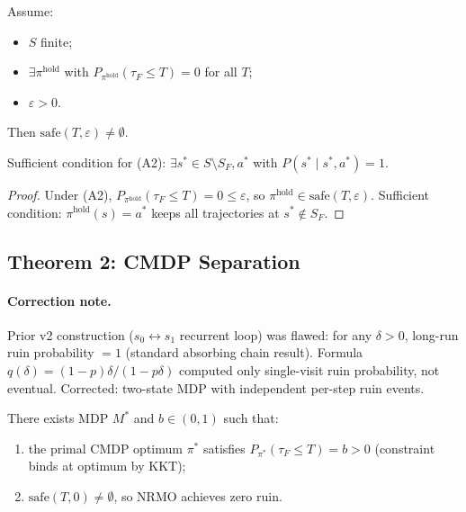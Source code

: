 \begin{lemma}
\label{lem:tf-v4-feasibility}
Assume:
\begin{itemize}
\item[(A1)] $S$ finite;
\item[(A2)] $\exists \pi^{\mathrm{hold}}$ with
$P_{\pi^{\mathrm{hold}}}(\tau_F \le T) = 0$ for all $T$;
\item[(A3)] $\varepsilon > 0$.
\end{itemize}
Then $\mathrm{safe}(T, \varepsilon) \ne \emptyset$.

Sufficient condition for (A2):
$\exists s^* \in S \setminus S_F, a^*$ with $P(s^* \mid s^*, a^*) =
1$.
\end{lemma}

\begin{proof}
Under (A2), $P_{\pi^{\mathrm{hold}}}(\tau_F \le T) = 0 \le
\varepsilon$, so $\pi^{\mathrm{hold}} \in \mathrm{safe}(T,
\varepsilon)$. Sufficient condition: $\pi^{\mathrm{hold}}(s) = a^*$
keeps all trajectories at $s^* \notin S_F$.
\end{proof}

\subsection{Theorem 2: CMDP Separation}

\paragraph{Correction note.}
Prior v2 construction ($s_0 \leftrightarrow s_1$ recurrent loop) was
flawed: for any $\delta > 0$, long-run ruin probability $= 1$
(standard absorbing chain result). Formula
$q(\delta) = (1 - p) \delta / (1 - p \delta)$ computed only
single-visit ruin probability, not eventual. Corrected: two-state
MDP with independent per-step ruin events.

\begin{theorem}
\label{thm:tf-v4-cmdp-separation}
There exists MDP $M^*$ and $b \in (0, 1)$ such that:
\begin{enumerate}
\item[(i)] the primal CMDP optimum $\pi^*$ satisfies
$P_{\pi^*}(\tau_F \le T) = b > 0$ (constraint binds at optimum by
KKT);
\item[(ii)] $\mathrm{safe}(T, 0) \ne \emptyset$, so NRMO achieves
zero ruin.
\end{enumerate}
\end{theorem}

